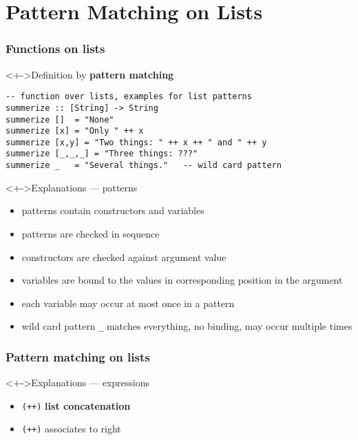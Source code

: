 \documentclass{beamer}
\begin{document}
\section{Pattern Matching on Lists}
\begin{frame}[fragile]
  \frametitle{Functions on lists}
  \begin{block}<+->{Definition by \textbf{pattern matching}}
\begin{lstlisting}
-- function over lists, examples for list patterns
summerize :: [String] -> String
summerize []  = "None"
summerize [x] = "Only " ++ x
summerize [x,y] = "Two things: " ++ x ++ " and " ++ y
summerize [_,_,_] = "Three things: ???"
summerize _   = "Several things."   -- wild card pattern
\end{lstlisting}
  \end{block}
  \begin{alertblock}<+->{Explanations --- patterns}
    \footnotesize{}
    \begin{itemize}
    \item patterns contain constructors and variables
    \item patterns are checked in sequence
    \item constructors are checked against argument value
    \item variables are bound to the values in
      corresponding position in the argument
    \item each variable may occur at most once in a pattern
    \item wild card pattern \verb!_! matches everything, no binding, may occur multiple times
    \end{itemize}
  \end{alertblock}

  \end{frame}
\begin{frame}[fragile]
  \frametitle{Pattern matching on lists}
\begin{alertblock}<+->{Explanations --- expressions}
    \begin{itemize}
    \item  \lstinline{(++)} \textbf{list concatenation}
    \item  \lstinline{(++)} associates to right
    \end{itemize}
  \end{alertblock}
  \end{frame}
\end{document}
